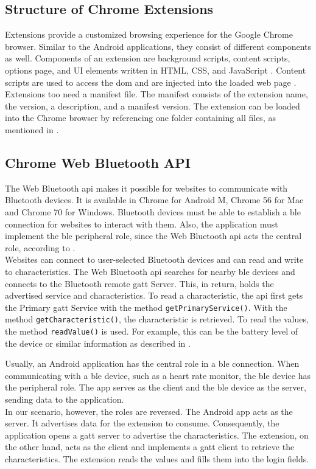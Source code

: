 \subsection{Structure of Chrome Extensions}
Extensions provide a customized browsing experience for the Google Chrome browser. Similar to the Android applications, they consist of different components as well. Components of an extension are background scripts, content scripts, options page, and UI elements written in HTML, CSS, and JavaScript \cite{Extensions}. Content scripts are used to access the \gls{dom} and are injected into the loaded web page \cite{LiuZYC12}. \\
Extensions too need a manifest file. The manifest consists of the extension name, the version, a description, and a manifest version. The extension can be loaded into the Chrome browser by referencing one folder containing all files, as mentioned in \cite{Extensions}.


\subsection{Chrome Web Bluetooth API}
The Web Bluetooth \gls{api} makes it possible for websites to communicate with Bluetooth devices. It is available in Chrome for Android M, Chrome 56 for Mac and Chrome 70 for Windows. Bluetooth devices must be able to establish a \gls{ble} connection for websites to interact with them. Also, the application must implement the \gls{ble} peripheral role, since the Web Bluetooth \gls{api} acts the central role, according to \cite{BTAPIMozilla}. \\
Websites can connect to user-selected Bluetooth devices and can read and write to characteristics. The Web Bluetooth \gls{api} searches for nearby \gls{ble} devices and connects to the Bluetooth remote \gls{gatt} Server. This, in return, holds the advertised service and characteristics. To read a characteristic, the \gls{api} first gets the Primary \gls{gatt} Service with the method \texttt{getPrimaryService()}. With the method \texttt{getCharacteristic()}, the characteristic is retrieved. To read the values, the method \texttt{readValue()} is used. For example, this can be the battery level of the device or similar information as described in \cite{WebBTAPI}.

Usually, an Android application has the central role in a \gls{ble} connection. When communicating with a \gls{ble} device, such as a heart rate monitor, the \gls{ble} device has the peripheral role. The app serves as the client and the \gls{ble} device as the server, sending data to the application. \\
In our scenario, however, the roles are reversed. The Android app acts as the server. It advertises data for the extension to consume. Consequently, the application opens a \gls{gatt} server to advertise the characteristics. The extension, on the other hand, acts as the client and implements a \gls{gatt} client to retrieve the characteristics. The extension reads the values and fills them into the login fields. \\